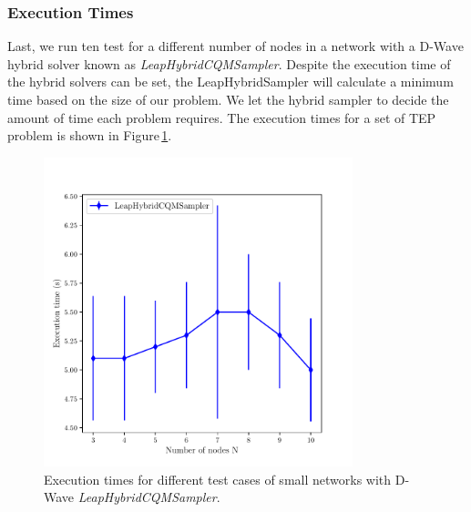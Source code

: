 \subsubsection{Execution Times}
Last, we run ten test for a different number of nodes in a network with a D-Wave hybrid solver known as \textit{LeapHybridCQMSampler}. Despite the execution time of the hybrid solvers can be set, the LeapHybridSampler will calculate a minimum time based on the size of our problem. We let the hybrid sampler to decide the amount of time each problem requires. The execution times for a set of TEP problem is shown in Figure\,\ref{fig: ExecutionTimes}. 
\begin{figure}[H]
  \begin{center}
\includegraphics[width=0.8\textwidth]{Figures/ExecutionTimes.pdf}
  \end{center}
  \caption{Execution times for different test cases of small networks with D-Wave \textit{LeapHybridCQMSampler}.}
  \label{fig: ExecutionTimes}
\end{figure}
